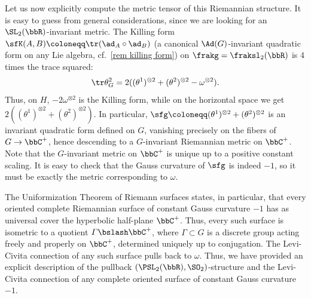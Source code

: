 \begin{example}
    Let us now explicitly compute the metric tensor of this Riemannian structure. It is easy to guess from general considerations, since we are looking for an $\SL_2(\bbR)$-invariant metric. The Killing form $\sfK(A,B)\coloneqq \tr(\ad_A\circ \ad_B)$ (a canonical $\Ad(G)$-invariant quadratic form on any Lie algebra, cf.\ \ref{rem killing form}) on $\frakg=\fraksl_{2}(\bbR)$ is $4$ times the trace squared:
    \[\tr \theta_G^2=2((\theta^1)^{\otimes 2}+(\theta^2)^{\otimes 2}-\omega^{\otimes 2}).\]
    Thus, on $H$, $-2\omega^{\otimes 2}$ is the Killing form, while on the horizontal space we get $2((\theta^1)^{\otimes 2}+(\theta^2)^{\otimes 2})$. In particular, $\sfg\coloneqq (\theta^1)^{\otimes 2}+(\theta^2)^{\otimes 2}$ is an invariant quadratic form defined on $G$, vanishing precisely on the fibers of $G\to \bbC^+$, hence descending to a $G$-invariant Riemannian metric on $\bbC^+$. Note that the $G$-invariant metric on $\bbC^+$ is unique up to a positive constant scaling. It is easy to check that the Gauss curvature of $\sfg$ is indeed $-1$, so it must be exactly the metric corresponding to $\omega$.

    The Uniformization Theorem of Riemann surfaces states, in particular, that every oriented complete Riemannian surface of constant Gauss curvature $-1$ has as universal cover the hyperbolic half-plane $\bbC^+$. Thus, every such surface is isometric to a quotient $\varGamma\bslash \bbC^+$, where $\varGamma\subset  G$ is a discrete group  acting freely and properly on $\bbC^+$, determined uniquely up to conjugation. The Levi-Civita connection of any such surface pulls back to $\omega$. Thus, we have provided an explicit description of the pullback $(\PSL_2(\bbR),\SO_2)$-structure and the Levi-Civita connection of any complete oriented surface of constant Gauss curvature $-1$.
\end{example}


